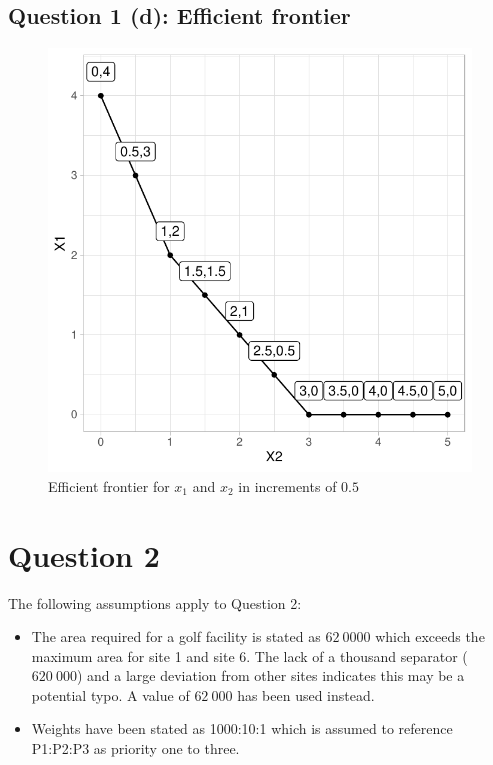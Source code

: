 \documentclass[a4paper,11pt]{article}
\begin{document}
\newpage
\subsection{Question 1 (d): Efficient frontier}
\begin{figure}[H]
    \centering
    \includegraphics{../R/Efficient_frontier}
    \caption{Efficient frontier for $x_1$ and $x_2$ in increments of $0.5$}
    \label{eff_front}
\end{figure}













\newpage
\section{Question 2}
The following assumptions apply to Question 2:
\begin{itemize}
	\item The area required for a golf facility is stated as $62 \ 0000$ which exceeds the maximum area for site 1 and site 6. The lack of a thousand separator ($620 \ 000$) and a large deviation from other sites indicates this may be a potential typo. A value of $62 \ 000$ has been used instead.
	\item Weights have been stated as 1000:10:1 which is assumed to reference P1:P2:P3 as priority one to three.
\end{itemize}
\end{document}
